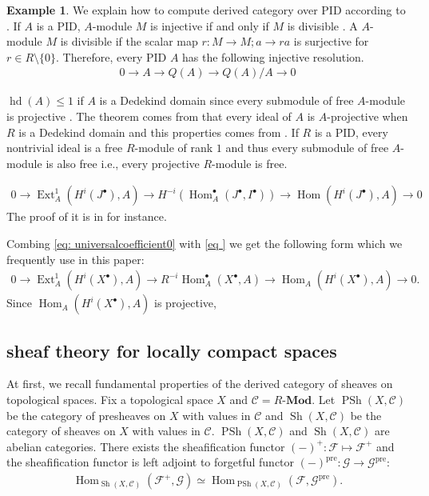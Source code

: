 \documentclass[a4paper,dvipdfmx,reqno,12pt]{amsart}
\theoremstyle{definition}
\newtheorem{Eg}[Thm]{Example}
\newcommand{\mcal}[1]{\mathcal{#1}}%
\newcommand{\opn}[1]{\operatorname{#1}}
\newcommand{\catn}[1]{\mathbf{#1}}
\numberwithin{equation}{section}
\begin{document}
\begin{Eg}
  We explain how to compute derived category over PID according to \cite[1.4]{MR2050072}.
  If $A$ is a PID, $A$-module $M$ is injective if and only if $M$ is divisible \cite[Corollary 2.3.2]{MR1269324}.
  A $A$-module $M$ is divisible if the scalar map $r:M\to M; a\to ra$ is surjective for $r\in R\setminus\{0\}$.
  Therefore, every PID $A$ has the following injective resolution.
  \begin{align}
    0 \to A \to Q(A) \to Q(A)/A \to 0
  \end{align}

  $\opn{hd}(A)\leq 1$ if $A$ is a Dedekind domain since every submodule of free $A$-module is projective \cite[Theorem 4.2.11, Exercise 4.2.6]{MR1269324}.
  The theorem comes from that every ideal of $A$ is $A$-projective when $R$ is a Dedekind domain and this properties comes from \cite[Theorem 7.12]{MR1011461}.
  If $R$ is a PID, every nontrivial ideal is a free $R$-module of rank $1$ and thus every submodule of free $A$-module is also free i.e., every projective $R$-module is free.



  \begin{align} \label{eq: universalcoefficient0}
    0\to \opn{Ext}^{1}_{A}(H^{i}(J^{\bullet}),A)\to H^{-i}(\opn{Hom}_A^{\bullet}(J^{\bullet},I^{\bullet}))\to \opn{Hom}(H^{i}(J^{\bullet}),A)  \to  0
  \end{align}
  The proof of it is in \cite[V. Theorem 3.1]{} for instance.

  Combing \cref{eq: universalcoefficient0} with \cref{eq } we get the following form which we frequently use in this paper:
  \begin{align} \label{eq: universalcoefficient}
    0\to \opn{Ext}^{1}_{A}(H^{i}(X^{\bullet}),A)\to R^{-i}\opn{Hom}_{A}^{\bullet}(X^{\bullet},A) \to \opn{Hom}_{A}(H^{i}(X^{\bullet}),A)  \to  0.
  \end{align}
  Since $\opn{Hom}_{A}(H^{i}(X^{\bullet}),A)$ is projective,

\end{Eg}

\subsection{sheaf theory for locally compact spaces}
At first, we recall fundamental properties of the derived category of sheaves on topological spaces.
Fix a topological space $X$ and $\mcal{C}=R\text{-}\catn{Mod}$.
Let $\opn{PSh}(X,\mcal{C})$ be the category of presheaves on $X$ with values in $\mcal{C}$ and $\opn{Sh}(X,\mcal{C})$ be the category of sheaves on $X$ with values in $\mcal{C}$.
$\opn{PSh}(X,\mcal{C})$ and $\opn{Sh}(X,\mcal{C})$ are abelian categories.
There exists the sheafification functor $(-)^{+}:\mcal{F} \mapsto \mcal{F}^{+}$ and the sheafification functor is left adjoint to forgetful functor $(-)^{\opn{pre}}:\mcal{G}\to \mcal{G}^{\opn{pre}}$:
\begin{align}
  \opn{Hom}_{\opn{Sh}(X,\mcal{C})}(\mcal{F}^{+},\mcal{G})\simeq \opn{Hom}_{\opn{PSh}(X,\mcal{C})}(\mcal{F},\mcal{G}^{\opn{pre}}).
\end{align}
\end{document}
